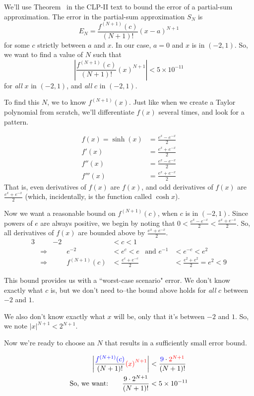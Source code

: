 \begin{solution}
	We'll use  Theorem~ in the CLP-II text to bound the error of a partial-sum approximation. The error in the partial-sum approximation $S_N$ is
	\[E_N=\frac{f^{(N+1)}(c)}{(N+1)!}(x-a)^{N+1}\]
	for some $c$ strictly between $a$ and $x$. In our case, $a=0$ and $x$ is in $(-2,1)$. So, we want to find a value of $N$ such that
	\[\left|\frac{f^{(N+1)}(c)}{(N+1)!}\left(x\right)^{N+1}\right|<5\times 10^{-11}\]
	for \emph{all} $x$ in $(-2,1)$, and \emph{all} $c$ in $(-2,1)$.

	To find this $N$, we to know $f^{(N+1)}(x)$. Just like when we create a Taylor polynomial from scratch, we'll differentiate $f(x)$ several times, and look for a pattern.

\begin{align*}
f(x)=\sinh(x)&=\frac{e^x-e^{-x}}{2}\\
f'(x)&=\frac{e^x+e^{-x}}{2}\\
f''(x)&=\frac{e^x-e^{-x}}{2}\\
f'''(x)&=\frac{e^x+e^{-x}}{2}
\end{align*}
That is, even derivatives of $f(x)$ are $f(x)$, and odd derivatives of $f(x)$ are $\frac{{e^x}+e^{-x}}{2}$ (which, incidentally, is the function called $\cosh x$).

	Now we want a reasonable bound on $f^{(N+1)}(c)$, when $c$ is in $(-2,1)$. Since powers of $e$ are always positive, we begin by noting that $0<\frac{e^x-e^{-x}}{2}<\frac{e^x+e^{-x}}{2}$. So, all derivatives of $f(x)$ are bounded above by $\frac{e^x+e^{-x}}{2}$.
	\begin{alignat*}{3}
	&&-2 &<c<1\\
	&\Rightarrow&\qquad e^{-2} &<e^c<e &\mbox{and } e^{-1}&<e^{-c}<e^2\\
	&\Rightarrow&\qquad f^{(N+1)}(c)&<\frac{e^c+e^{-c}}{2} & &<\frac{e^2+e^2}{2}=e^2<9
	\end{alignat*}

	This bound provides us with a ``worst-case scenario" error. We don't know exactly what $c$ is, but we don't need to--the bound above holds for \emph{all} $c$ between $-2$ and $1$.

	We also don't know exactly what $x$ will be, only that it's between $-2$ and $1$. So, we note $|x|^{N+1}<2^{N+1}$.

	Now we're ready to choose an $N$ that results in a sufficiently small error bound.

	\begin{align*}
	\left|\frac{\textcolor{blue}{f^{(N+1)}(c)}}{(N+1)!}\textcolor{red}{\left(x\right)^{N+1}}\right|&<
	\frac{\textcolor{blue}{9}\cdot \textcolor{red}{2^{N+1}}}{(N+1)!}\\
	\text{So, we want:}\qquad \frac{9\cdot2^{N+1}}{(N+1)!}&<5\times 10^{-11}
	\end{align*}


\end{solution}
